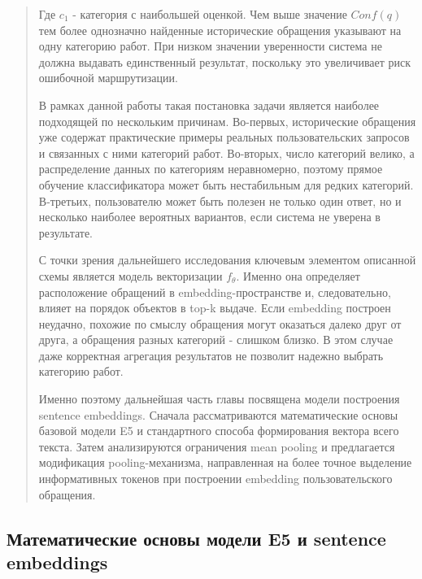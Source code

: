 \documentclass[
]{article}
\begin{document}
\begin{quote}
Где \(c_{1}\) - категория с наибольшей оценкой. Чем выше значение
\(Conf(q)\) тем более однозначно найденные исторические обращения
указывают на одну категорию работ. При низком значении уверенности
система не должна выдавать единственный результат, поскольку это
увеличивает риск ошибочной маршрутизации.

В рамках данной работы такая постановка задачи является наиболее
подходящей по нескольким причинам. Во-первых, исторические обращения уже
содержат практические примеры реальных пользовательских запросов и
связанных с ними категорий работ. Во-вторых, число категорий велико, а
распределение данных по категориям неравномерно, поэтому прямое обучение
классификатора может быть нестабильным для редких категорий. В-третьих,
пользователю может быть полезен не только один ответ, но и несколько
наиболее вероятных вариантов, если система не уверена в результате.

С точки зрения дальнейшего исследования ключевым элементом описанной
схемы является модель векторизации \(f_{\theta}\). Именно она определяет
расположение обращений в embedding-пространстве и, следовательно, влияет
на порядок объектов в top-k выдаче. Если embedding построен неудачно,
похожие по смыслу обращения могут оказаться далеко друг от друга, а
обращения разных категорий - слишком близко. В этом случае даже
корректная агрегация результатов не позволит надежно выбрать категорию
работ.

Именно поэтому дальнейшая часть главы посвящена модели построения
sentence embeddings. Сначала рассматриваются математические основы
базовой модели E5 и стандартного способа формирования вектора всего
текста. Затем анализируются ограничения mean pooling и предлагается
модификация pooling-механизма, направленная на более точное выделение
информативных токенов при построении embedding пользовательского
обращения.
\end{quote}

\hypertarget{ux43cux430ux442ux435ux43cux430ux442ux438ux447ux435ux441ux43aux438ux435-ux43eux441ux43dux43eux432ux44b-ux43cux43eux434ux435ux43bux438-e5-ux438-sentence-embeddings}{%
\subsection{\texorpdfstring{Математические основы модели E5 и sentence
embeddings\\
}{Математические основы модели E5 и sentence embeddings }}\label{ux43cux430ux442ux435ux43cux430ux442ux438ux447ux435ux441ux43aux438ux435-ux43eux441ux43dux43eux432ux44b-ux43cux43eux434ux435ux43bux438-e5-ux438-sentence-embeddings}}
\end{document}
